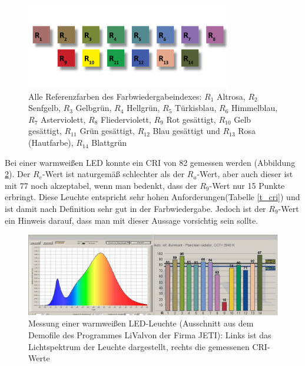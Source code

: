 \begin{figure}[htp]     %
\centering
\includegraphics[width=0.8\textwidth]{bilder/cri} 
\caption {Alle Referenzfarben des Farbwiedergabeindexes: $R_{1}$ Altrosa, $R_{2}$ Senfgelb, $R_{3}$ Gelbgrün, $R_{4}$ Hellgrün, $R_{5}$ Türkisblau, $R_{6}$ Himmelblau, $R_{7}$ Asterviolett, $R_{8}$ Fliederviolett, $R_{9}$ Rot gesättigt, $R_{10}$ Gelb gesättigt, $R_{11}$ Grün gesättigt, $R_{12}$ Blau gesättigt und $R_{13}$ Rosa (Hautfarbe), $R_{14}$ Blattgrün \protect\footnotemark}\label{b_cri}
\end{figure}



Bei einer warmweißen LED konnte ein CRI von 82 gemessen werden (Abbildung \ref{b_cri2}). Der $R_{e}$-Wert ist naturgemäß schlechter als der $R_{a}$-Wert, aber auch dieser ist mit 77 noch akzeptabel, wenn man bedenkt, dass der $R_{9}$-Wert nur 15 Punkte erbringt. Diese Leuchte entspricht \glqq sehr hohen Anforderungen\grqq (Tabelle \ref{t_cri}) und ist damit nach Definition sehr gut in der Farbwiedergabe. Jedoch ist der $R_{9}$-Wert ein Hinweis darauf, dass man mit dieser Aussage vorsichtig sein sollte.

\begin{figure}[htp]     %
\centering
\includegraphics[width=1.0\textwidth]{bilder/cri2} 
\caption {Messung einer warmweißen LED-Leuchte (Ausschnitt aus dem Demofile des Programmes \glqq LiVal\grqq von der Firma JETI): Links ist das Lichtspektrum der Leuchte dargestellt, rechts die gemessenen CRI-Werte  \protect\footnotemark}\label{b_cri2}
\end{figure}

